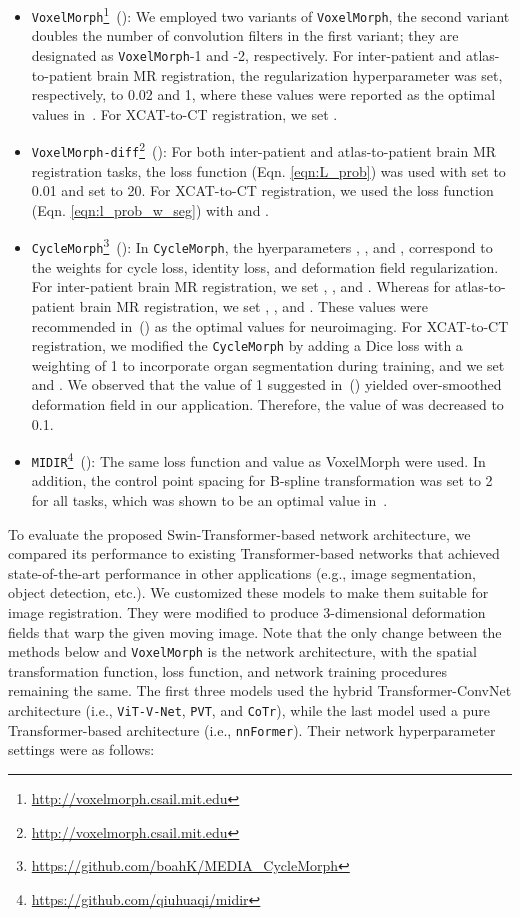 \documentclass[times,twocolumn,final]{elsarticle}
\begin{document}
\begin{itemize}[noitemsep]
    \item \texttt{VoxelMorph}\footnote{\url{http://voxelmorph.csail.mit.edu}}~(\cite{balakrishnan2018unsupervised,balakrishnan2019voxelmorph}): We employed two variants of \texttt{VoxelMorph}, the second variant doubles the number of convolution filters in the first variant; they are designated as \texttt{VoxelMorph}-1 and -2, respectively. For inter-patient and atlas-to-patient brain MR registration, the regularization hyperparameter  was set, respectively, to 0.02 and 1, where these values were reported as the optimal values in~\cite{balakrishnan2019voxelmorph}. For XCAT-to-CT registration, we set .
    \item \texttt{VoxelMorph-diff}\footnote{\url{http://voxelmorph.csail.mit.edu}}~(\cite{dalca2019unsupervised}): For both inter-patient and atlas-to-patient brain MR registration tasks, the loss function  (Eqn. \ref{eqn:L_prob}) was used with  set to 0.01 and  set to 20. For XCAT-to-CT registration, we used the loss function  (Eqn. \ref{eqn:l_prob_w_seg}) with  and .
    \item \texttt{CycleMorph}\footnote{\url{https://github.com/boahK/MEDIA_CycleMorph}}~(\cite{kim2021cyclemorph}): In \texttt{CycleMorph}, the hyerparameters , , and , correspond to the weights for cycle loss, identity loss, and deformation field regularization. For inter-patient brain MR registration, we set , , and . Whereas for atlas-to-patient brain MR registration, we set , , and . These values were recommended in~(\cite{kim2021cyclemorph}) as the optimal values for neuroimaging. For XCAT-to-CT registration, we modified the \texttt{CycleMorph} by adding a Dice loss with a weighting of 1 to incorporate organ segmentation during training, and we set  and . We observed that the  value of 1 suggested in~(\cite{kim2021cyclemorph}) yielded over-smoothed deformation field in our application. Therefore, the value of  was decreased to 0.1. 
    \item \texttt{MIDIR}\footnote{\url{https://github.com/qiuhuaqi/midir}}~(\cite{qiu2021learning}): The same loss function and  value as VoxelMorph were used. In addition, the control point spacing  for B-spline transformation was set to 2 for all tasks, which was shown to be an optimal value in~\cite{qiu2021learning}. 
\end{itemize}
To evaluate the proposed Swin-Transformer-based network architecture, we compared its performance to existing Transformer-based networks that achieved state-of-the-art performance in other applications (e.g., image segmentation, object detection, etc.). We customized these models to make them suitable for image registration. They were modified to produce 3-dimensional deformation fields that warp the given moving image. Note that the only change between the methods below and \texttt{VoxelMorph} is the network architecture, with the spatial transformation function, loss function, and network training procedures remaining the same. The first three models used the hybrid Transformer-ConvNet architecture (i.e., \texttt{ViT-V-Net}, \texttt{PVT}, and \texttt{CoTr}), while the last model used a pure Transformer-based architecture (i.e., \texttt{nnFormer}). Their network hyperparameter settings were as follows:
\end{document}
